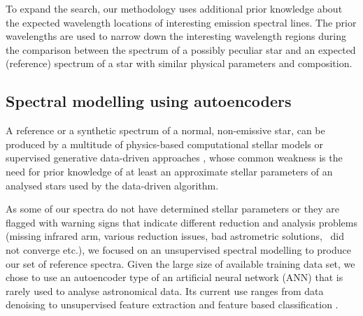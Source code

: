 To expand the search, our methodology uses additional prior knowledge about the expected wavelength locations of interesting emission spectral lines. The prior wavelengths are used to narrow down the interesting wavelength regions during the comparison between the spectrum of a possibly peculiar star and an expected (reference) spectrum of a star with similar physical parameters and composition.

\subsection{Spectral modelling using autoencoders}
\label{sec:ref_modeling}
A reference or a synthetic spectrum of a normal, non-emissive star, can be produced by a multitude of physics-based computational stellar models \cite{1993sssp.book.....K, 2005A&A...442.1127M, 2012ASInC...6...53D} or supervised generative data-driven approaches \cite{2015AAS...22530207N, 2019ApJ...879...69T}, whose common weakness is the need for prior knowledge of at least an approximate stellar parameters of an analysed stars used by the data-driven algorithm.

As some of our spectra do not have determined stellar parameters or they are flagged with warning signs that indicate different reduction and analysis problems (missing infrared arm, various reduction issues, bad astrometric solutions, \SME\ did not converge etc.), we focused on an unsupervised spectral modelling to produce our set of reference spectra. Given the large size of available training data set, we chose to use an autoencoder type of an artificial neural network (ANN) that is rarely used to analyse astronomical data. Its current use ranges from data denoising \cite{2017ChA&A..41..282Q, 2019arXiv190303105S, 2019MNRAS.485.2628L} to unsupervised feature extraction and feature based classification \cite{2015MNRAS.452..158Y, 2017RAA....17...36L, 2017ChA&A..41..318P, 2018arXiv180901434K, 2019arXiv191104320C, 2019ApJS..240...34M, 2019PASP..131j8011R}.

